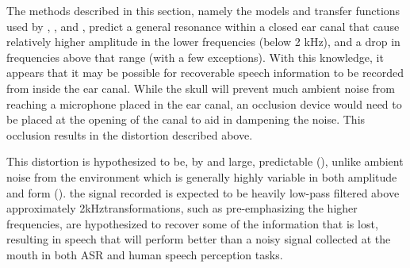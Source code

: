 

The methods described in this section, namely the models and transfer functions used by \cite{hansen:97b}, \cite{stenfelt:07}, and \cite{reinfeldt:10}, predict a general resonance within a closed ear canal that cause relatively higher amplitude in the lower frequencies (below 2 kHz), and a drop in frequencies above that range (with a few exceptions).  With this knowledge, it appears that it may be possible for recoverable speech information to be recorded from inside the ear canal.  While the skull will prevent much ambient noise from reaching a microphone placed in the ear canal, an occlusion device would need to be placed at the opening of the canal to aid in dampening the noise.  This occlusion results in the distortion described above.

This distortion is hypothesized to be, by and large, predictable (\cite{reinfeldt:10}), unlike ambient noise from the environment which is generally highly variable in both amplitude and form (\cite{zhang:17}). \DIFdelbegin {}\DIFdelend \DIFaddbegin {}\DIFaddend the signal recorded \DIFaddbegin {}\DIFaddend is expected to be heavily low-pass filtered above approximately 2kHz\DIFdelbegin {}\DIFdelend \DIFaddbegin {}\DIFaddend transformations, such as pre-emphasizing the higher frequencies, are hypothesized to recover some of the information that is lost, resulting in speech that will perform better than a noisy signal collected at the mouth in both ASR and human speech perception tasks.
\DIFaddbegin {}\DIFaddend 


